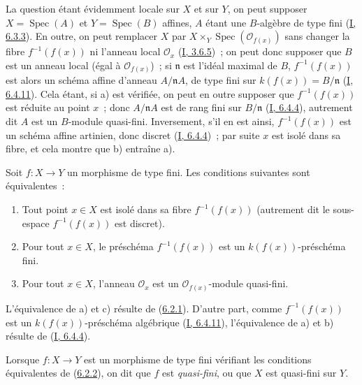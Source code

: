 La question étant évidemment locale sur $X$ et sur $Y$, on peut supposer
$X=\operatorname{Spec}(A)$ et $Y=\operatorname{Spec}(B)$ affines, $A$ étant
une $B$-algèbre de type fini (\hyperref[I.6.3.3-fr]{I, 6.3.3}). En outre, on
peut remplacer $X$ par $X\times_Y\operatorname{Spec}(\mathcal{O}_{f(x)})$
sans changer la fibre $f^{-1}(f(x))$ ni l'anneau local $\mathcal{O}_x$
(\hyperref[I.3.6.5-fr]{I, 3.6.5})~; on peut donc supposer que $B$ est un
anneau local (égal à $\mathcal{O}_{f(x)}$)~; si $\mathfrak{n}$ est l'idéal
maximal de $B$, $f^{-1}(f(x))$ est alors un schéma affine d'anneau
$A/\mathfrak{n}A$, de type fini sur $k(f(x))=B/\mathfrak{n}$
(\hyperref[I.6.4.11-fr]{I, 6.4.11}). Cela étant, si a) est vérifiée, on peut
en outre supposer que $f^{-1}(f(x))$ est réduite au point $x$~; donc
$A/\mathfrak{n}A$ est de rang fini sur $B/\mathfrak{n}$
(\hyperref[I.6.4.4-fr]{I, 6.4.4}), autrement dit $A$ est un $B$-module
quasi-fini. Inversement, s'il en est ainsi, $f^{-1}(f(x))$ est un schéma
affine artinien, donc discret (\hyperref[I.6.4.4-fr]{I, 6.4.4})~; par suite
$x$ est isolé dans sa fibre, et cela montre que b) entraîne a).

\begin{corollary}[6.2.2]
\label{II.6.2.2-fr}
Soit $f:X\to Y$ un morphisme de type fini. Les conditions suivantes sont
équivalentes~:
\begin{enumerate}
\item[a)] Tout point $x\in X$ est isolé dans sa fibre $f^{-1}(f(x))$
(autrement dit le sous-espace $f^{-1}(f(x))$ est discret).
\item[b)] Pour tout $x\in X$, le préschéma $f^{-1}(f(x))$ est un
$k(f(x))$-préschéma fini.
\item[c)] Pour tout $x\in X$, l'anneau $\mathcal{O}_x$ est un
$\mathcal{O}_{f(x)}$-module quasi-fini.
\end{enumerate}
\end{corollary}

L'équivalence de a) et c) résulte de
(\hyperref[II.6.2.1-fr]{6.2.1}). D'autre part, comme $f^{-1}(f(x))$ est un
$k(f(x))$-préschéma algébrique (\hyperref[I.6.4.11-fr]{I, 6.4.11}),
l'équivalence de a) et b) résulte de (\hyperref[I.6.4.4-fr]{I, 6.4.4}).

\begin{definition}[6.2.3]
\label{II.6.2.3-fr}
Lorsque $f:X\to Y$ est un morphisme de type fini vérifiant les conditions
équivalentes de (\hyperref[II.6.2.2-fr]{6.2.2}), on dit que $f$ est
\emph{quasi-fini}, ou que $X$ est quasi-fini sur $Y$.
\end{definition}

